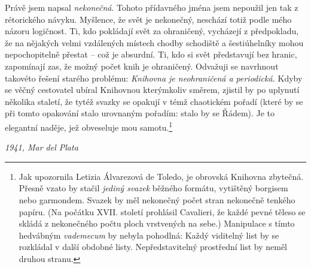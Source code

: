 \documentclass[11pt]{article}
\begin{document}
Právě jsem napsal \textit{nekonečná}. Tohoto přídavného jména jsem nepoužil jen tak z rétorického návyku. Myšlence, že svět je nekonečný, neschází totiž podle mého názoru logičnost. Ti, kdo pokládají svět za ohraničený, vycházejí z předpokladu, že na nějakých velmi vzdálených místech chodby schodiště a šestiúhelníky mohou nepochopitelně přestat -- což je absurdní. Ti, kdo si svět představují bez hranic, zapomínají zas, že možný počet knih je ohraničený. Odvažuji se navrhnout takovéto řešení starého problému: \textit{Knihovna je neohraničená a periodická.} Kdyby se věčný cestovatel ubíral Knihovnou kterýmkoliv směrem, zjistil by po uplynutí několika staletí, že tytéž svazky se opakují v témž chaotickém pořadí (které by se při tomto opakování stalo urovnaným pořadím: stalo by se Řádem). Je to elegantní naděje, jež obveseluje mou samotu.\footnote{Jak upozornila Letizia Álvarezová de Toledo, je obrovská Knihovna zbytečná. Přesně vzato by stačil \textit{jediný svazek} běžného formátu, vytištěný borgisem nebo garmondem. Svazek by měl nekonečný počet stran nekonečně tenkého papíru. (Na počátku XVII. století prohlásil Cavalieri, že každé pevné těleso se skládá z nekonečného počtu ploch vrstvených na sebe.) Manipulace s tímto hedvábným \textit{vademecum} by nebyla pohodlná: Každý viditelný list by se rozkládal v další obdobné listy. Nepředstavitelný prostřední list by neměl druhou stranu.}

\raggedleft
\textit{1941, Mar del Plata}
\end{document}

